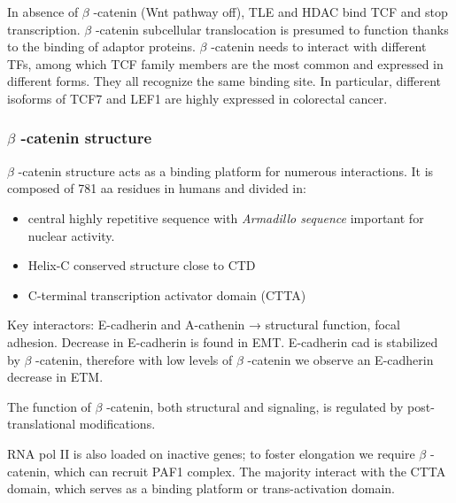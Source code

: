 In absence of $\beta$  -catenin (Wnt pathway off), TLE and HDAC bind TCF and stop transcription. $\beta$  -catenin subcellular translocation is presumed to function thanks to the binding of adaptor proteins. $\beta$  -catenin needs to interact with different TFs, among which TCF family members are the most common and expressed in different forms. They all recognize the same binding site. In particular, different isoforms of TCF7 and LEF1 are highly expressed in colorectal cancer.

\hypertarget{ux3b2-catenin-structure}{%
\subsubsection{$\beta$  -catenin structure}\label{ux3b2-catenin-structure}}

$\beta$  -catenin structure acts as a binding platform for numerous interactions. It is composed of 781 aa residues in humans and divided in:

\begin{itemize}
\tightlist
\item
  central highly repetitive sequence with \emph{Armadillo sequence} important for nuclear activity.
\item
  Helix-C conserved structure close to CTD
\item
  C-terminal transcription activator domain (CTTA)
\end{itemize}

Key interactors: E-cadherin and A-cathenin → structural function, focal adhesion. Decrease in E-cadherin is found in EMT. E-cadherin cad is stabilized by $\beta$  -catenin, therefore with low levels of $\beta$  -catenin we observe an E-cadherin decrease in ETM.

The function of $\beta$  -catenin, both structural and signaling, is regulated by post-translational modifications.

RNA pol II is also loaded on inactive genes; to foster elongation we require $\beta$  -catenin, which can recruit PAF1 complex. The majority interact with the CTTA domain, which serves as a binding platform or trans-activation domain.

